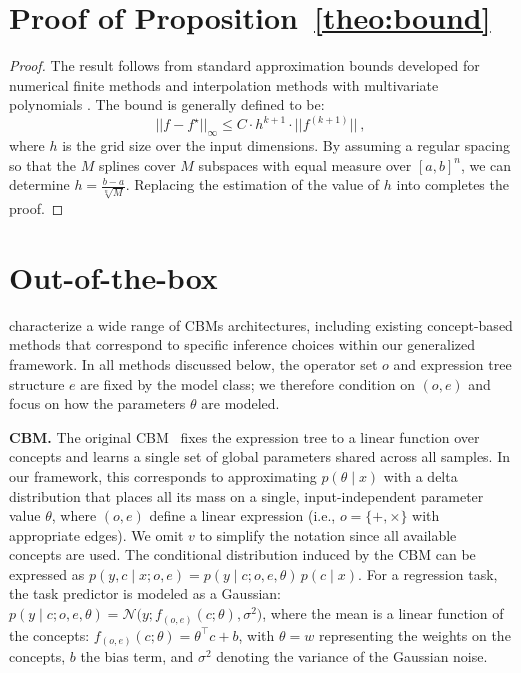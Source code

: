 \documentclass{article}
\theoremstyle{plain}
\theoremstyle{definition}
\theoremstyle{remark}
\newcommand{\mypar}[1]{\noindent\textbf{#1}}
\begin{document}
\section{Proof of Proposition~\ref{theo:bound}}
\label{app:approximation_proof}
\begin{proof}
The result follows from standard approximation bounds developed for numerical finite methods and interpolation methods with multivariate polynomials \citep{mossner2009error}. The bound is generally defined to be:
\begin{equation}
||f - f^\star||_\infty \le C \cdot h^{k+1} \cdot ||f^{(k+1)}|| \ ,
\label{eq:spline_bound} 
\end{equation}
where $h$ is the grid size over the input dimensions. By assuming a regular spacing so that the $M$ splines cover $M$ subspaces with equal measure over $[a,b]^n$, we can determine $h = \frac{b-a}{\sqrt[n]{M}}$. Replacing the estimation of the value of $h$ into  completes the proof.

\end{proof}


\section{Out-of-the-box \classacro{}}
\label{app:existing_cbms}

\classacrosingular{} characterize a wide range of CBMs architectures, including existing concept-based methods that correspond to specific inference choices within our generalized framework. In all methods discussed below, the operator set $o$ and expression tree structure $e$ are fixed by the model class; we therefore condition on $(o,e)$ and focus on how the parameters $\theta$ are modeled.

\mypar{CBM.} The original CBM~\citep{koh2020concept} fixes the expression tree to a linear function over concepts and learns a single set of global parameters shared across all samples. In our framework, this corresponds to approximating \(p(\theta \mid x)\) with a delta distribution that places all its mass on a single, input-independent parameter value $\theta$, where \((o,e)\) define a linear expression (i.e., \(o = \{+, \times\}\) with appropriate edges).  We omit $v$ to simplify the notation since all available concepts are used. The conditional distribution induced by the CBM can be expressed as $p(y, c \mid x; o, e) = p(y \mid c; o, e, \theta)\, p(c \mid x)$. For a regression task, the task predictor is modeled as a Gaussian: $p(y \mid c; o, e, \theta) = \mathcal{N}\big(y; f_{(o,e)}(c;\theta), \sigma^2\big)$, where the mean is a linear function of the concepts: $f_{(o,e)}(c;\theta) = \theta^\top c + b$, with $\theta = w$ representing the weights on the concepts, $b$ the bias term, and $\sigma^2$ denoting the variance of the Gaussian noise.
\end{document}
